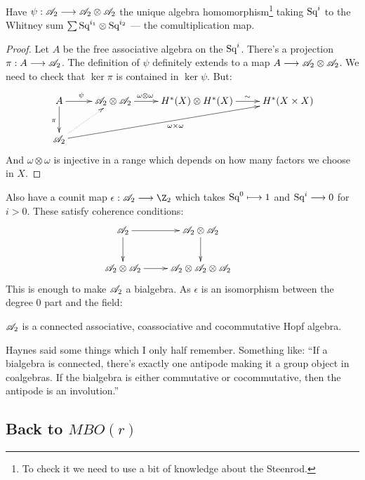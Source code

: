 \documentclass[11pt]{article}
\begin{document}
\begin{JeremyThomTalk}
\begin{prop*}
Have $\psi:\mathscr{A}_2\longrightarrow\mathscr{A}_2\otimes\mathscr{A}_2$ the unique algebra homomorphism\footnote{To check it we need to use a bit of knowledge about the Steenrod.} taking $\textup{Sq}^i$ to the Whitney sum $\sum \textup{Sq}^{i_1}\otimes\textup{Sq}^{i_2}$ --- the comultiplication map.
\end{prop*}
\begin{proof}
Let $A$ be the free associative algebra on the $\textup{Sq}^i$. There's a projection $\pi:A\longrightarrow\mathscr{A}_2$. The definition of $\psi$ definitely extends to a map $A\longrightarrow\mathscr{A}_2\otimes\mathscr{A}_2$. We need to check that $\ker\pi$ is contained in $\ker\psi$. But:
\[\xymatrix{
A\ar[r]^{\psi\quad}\ar[d]_\pi &\Steen\otimes\Steen
\ar[r]^{\omega\otimes\omega\qquad} &H^*(X)\otimes H^*(X)\ar[r]^{\quad\sim}&H^*(X\times X)\\
\Steen \ar[rrru]_{\omega\times\omega}\ar@{..>}[ur]
}\]
And $\omega\otimes\omega$ is injective in a range which depends on how many factors we choose in $X$.
\end{proof}
Also have a counit map $\epsilon:\Steen\to\Z_2$ which takes $\textup{Sq}^0\longmapsto 1$ and $\textup{Sq}^i\longrightarrow0$ for $i>0$. These satisfy coherence conditions:
\[\xymatrix{\Steen\ar[r]\ar[d]&\Steen \otimes\Steen\ar[d]&\\
\Steen\otimes\Steen\ar[r]&\Steen\otimes \Steen\otimes\Steen}\]
This is enough to make $\mathscr{A}_2$ a bialgebra. As $\epsilon$ is an isomorphism between the degree 0 part and the field:
\begin{fact*}
$\mathscr{A}_2$ is a connected associative, coassociative and cocommutative Hopf algebra.
\end{fact*}
\begin{rmk*}
Haynes said some things which I only half remember. Something like:
``If a bialgebra is connected, there's exactly one antipode making it a group object in coalgebras. If the bialgebra is either commutative or cocommutative, then the antipode is an involution.''

\end{rmk*}
\noindent 
\subsection*{Back to $MBO(r)$}


\end{JeremyThomTalk}
\end{document}
